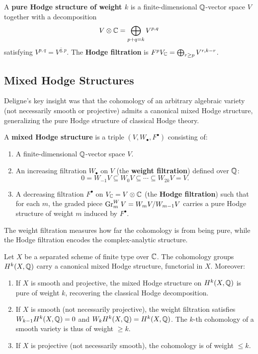 A \textbf{pure Hodge structure of weight \(k\)} is a finite-dimensional \(\mathbb{Q}\)-vector space \(V\) together with a decomposition
\[
V \otimes \mathbb{C} = \bigoplus_{p+q=k} V^{p,q}
\]
satisfying \(V^{p,q} = \overline{V^{q,p}}\). The \textbf{Hodge filtration} is \(F^p V_{\mathbb{C}} = \bigoplus_{r \geq p} V^{r, k-r}\).

\subsection{Mixed Hodge Structures}

Deligne's key insight was that the cohomology of an arbitrary algebraic variety (not necessarily smooth or projective) admits a canonical mixed Hodge structure, generalizing the pure Hodge structure of classical Hodge theory.

\begin{definition}
A \textbf{mixed Hodge structure} is a triple \((V, W_\bullet, F^\bullet)\) consisting of:
\begin{enumerate}
    \item A finite-dimensional \(\mathbb{Q}\)-vector space \(V\).
    \item An increasing filtration \(W_\bullet\) on \(V\) (the \textbf{weight filtration}) defined over \(\mathbb{Q}\):
    \[
    0 = W_{-1} V \subseteq W_0 V \subseteq \cdots \subseteq W_{2k} V = V.
    \]
    \item A decreasing filtration \(F^\bullet\) on \(V_{\mathbb{C}} = V \otimes \mathbb{C}\) (the \textbf{Hodge filtration}) such that for each \(m\), the graded piece \(\operatorname{Gr}^W_m V = W_m V / W_{m-1} V\) carries a pure Hodge structure of weight \(m\) induced by \(F^\bullet\).
\end{enumerate}
\end{definition}

The weight filtration measures how far the cohomology is from being pure, while the Hodge filtration encodes the complex-analytic structure.

\begin{theorem}[Deligne, 1971--1974]
Let \(X\) be a separated scheme of finite type over \(\mathbb{C}\). The cohomology groups \(H^k(X, \mathbb{Q})\) carry a canonical mixed Hodge structure, functorial in \(X\). Moreover:
\begin{enumerate}
    \item If \(X\) is smooth and projective, the mixed Hodge structure on \(H^k(X, \mathbb{Q})\) is pure of weight \(k\), recovering the classical Hodge decomposition.
    \item If \(X\) is smooth (not necessarily projective), the weight filtration satisfies \(W_{k-1} H^k(X, \mathbb{Q}) = 0\) and \(W_k H^k(X, \mathbb{Q}) = H^k(X, \mathbb{Q})\). The \(k\)-th cohomology of a smooth variety is thus of weight \(\geq k\).
    \item If \(X\) is projective (not necessarily smooth), the cohomology is of weight \(\leq k\).
\end{enumerate}
\end{theorem}

